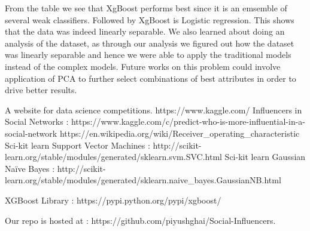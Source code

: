 \documentclass[conference]{IEEEtran}
\numberwithin{equation}{section}
\numberwithin{figure}{section}
\numberwithin{table}{section}
\begin{document}
From the table we see that XgBoost performs best since it is an emsemble of several weak classifiers. Followed by XgBoost is Logistic regression. This shows that the data was indeed linearly separable. We also learned about doing an analysis of the dataset, as through our analysis we figured out how the dataset was linearly separable and hence we were able to apply the traditional models instead of the complex models.
Future works on this problem could involve application of PCA to further select combinations of best attributes in order to drive better results.

\begin{thebibliography}{1}
A website for data science competitions. https://www.kaggle.com/
Influencers in Social Networks : https://www.kaggle.com/c/predict-who-is-more-influential-in-a-social-network
https://en.wikipedia.org/wiki/Receiver\_operating\_characteristic
Sci-kit learn Support Vector Machines : http://scikit-learn.org/stable/modules/generated/sklearn.svm.SVC.html
Sci-kit learn Gaussian Na{\"i}ve Bayes : http://scikit-learn.org/stable/modules/generated/sklearn.naive\_bayes.GaussianNB.html

XGBoost Library : https://pypi.python.org/pypi/xgboost/

Our repo is hosted at : https://github.com/piyushghai/Social-Influencers.
\end{thebibliography}

\end{document}
